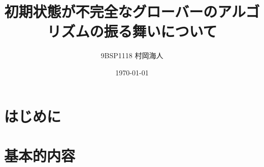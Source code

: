 \documentclass[platex,dvipdfmx, titlepage]{jlreq}			%
\title{初期状態が不完全なグローバーのアルゴリズムの振る舞いについて}
\author{9BSP1118 村岡海人}
\date{\today}
\begin{document}
\maketitle
\tableofcontents
\clearpage

\makeatletter
\renewcommand{\theequation}{%
\thesection.\arabic{equation}}
\makeatother

\section{はじめに}


\section{基本的内容}




\end{document}
